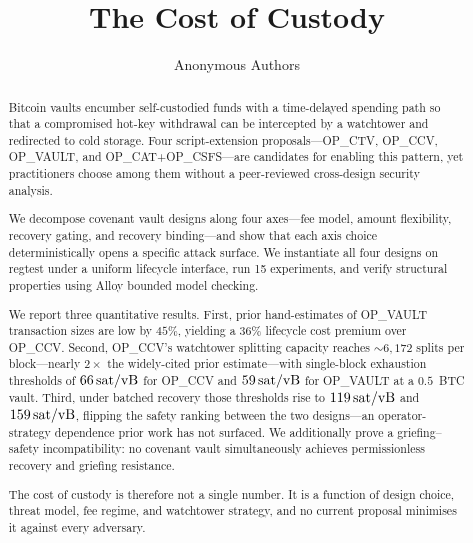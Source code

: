 \documentclass[runningheads]{llncs}
\title{The Cost of Custody}
\author{Anonymous Authors}
\institute{Anonymous Institution\\
\email{anonymous@submission.invalid}}
\newcommand{\satvB}{\text{\,sat/vB}}
\newcommand{\opctv}{OP\_CTV}
\newcommand{\opccv}{OP\_CCV}
\newcommand{\opvault}{OP\_VAULT}
\newcommand{\opcat}{OP\_CAT}
\newcommand{\opcsfs}{OP\_CSFS}
\newcommand{\catcsfs}{\opcat{}+\opcsfs{}}
\begin{document}
\maketitle

\begin{abstract}
Bitcoin vaults encumber self-custodied funds with a time-delayed
spending path so that a compromised hot-key withdrawal can be
intercepted by a watchtower and redirected to cold storage. Four
script-extension proposals---\opctv{}, \opccv{}, \opvault{}, and
\catcsfs{}---are candidates for enabling this pattern, yet
practitioners choose among them without a peer-reviewed cross-design
security analysis.

We decompose covenant vault designs along four axes---fee model,
amount flexibility, recovery gating, and recovery binding---and show
that each axis choice deterministically opens a specific attack
surface. We instantiate all four designs on regtest under a uniform
lifecycle interface, run 15 experiments, and verify structural
properties using Alloy bounded model checking.

We report three quantitative results. First, prior hand-estimates
of \opvault{} transaction sizes are low by $45\%$, yielding a $36\%$
lifecycle cost premium over \opccv{}. Second, \opccv{}'s watchtower
splitting capacity reaches ${\sim}6{,}172$ splits per block---nearly
$2\times$ the widely-cited prior estimate---with single-block
exhaustion thresholds of $66\satvB$ for \opccv{} and $59\satvB$ for
\opvault{} at a $0.5$~BTC vault. Third, under batched recovery those
thresholds rise to $119\satvB$ and $159\satvB$, flipping the safety
ranking between the two designs---an operator-strategy dependence
prior work has not surfaced. We additionally prove a
griefing--safety incompatibility: no covenant vault simultaneously
achieves permissionless recovery and griefing resistance.

The cost of custody is therefore not a single number. It is a
function of design choice, threat model, fee regime, and watchtower
strategy, and no current proposal minimises it against every
adversary.
\end{abstract}













\appendix




\end{document}
